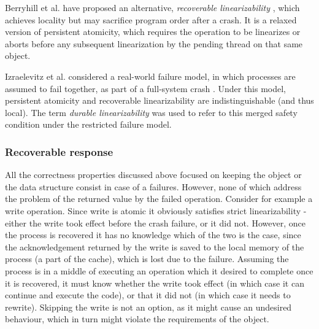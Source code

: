 \documentclass{article}
\begin{document}
Berryhill et al. have proposed an alternative, \emph{recoverable linearizability} \cite{DBLP:conf/opodis/BerryhillGT15}, which achieves locality but may sacrifice program order after a crash. It is a relaxed version of persistent atomicity, which requires the operation to be linearizes or aborts before any subsequent linearization by the pending thread on that same object.

Izraelevitz et al. considered a real-world failure model, in which processes are assumed to fail together, as part of a full-system crash \cite{DBLP:conf/wdag/IzraelevitzMS16}. Under this model, persistent atomicity and recoverable linearizability are indistinguishable (and thus local). The term \emph{durable linearizability} was used to refer to this merged safety condition under the restricted failure model.

\subsubsection{Recoverable response}
All the correctness properties discussed above focused on keeping the object or the data structure consist in case of a failures. However, none of which address the problem of the returned value by the failed operation. Consider for example a write operation. Since write is atomic it obviously satisfies strict linearizability - either the write took effect before the crash failure, or it did not. However, once the process is recovered it has no knowledge which of the two is the case, since the acknowledgement returned by the write is saved to the local memory of the process (a part of the cache), which is lost due to the failure. Assuming the process is in a middle of executing an operation which it desired to complete once it is recovered, it must know whether the write took effect (in which case it can continue and execute the code), or that it did not (in which case it needs to rewrite). Skipping the write is not an option, as it might cause an undesired behaviour, which in turn might violate the requirements of the object.
\end{document}
